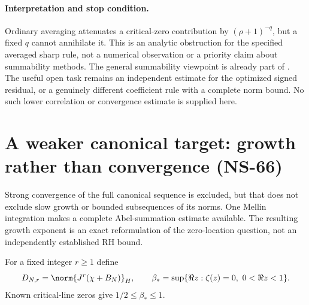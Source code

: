 \paragraph{Interpretation and stop condition.}
Ordinary averaging attenuates a critical-zero contribution by
$(\rho+1)^{-q}$, but a fixed $q$ cannot annihilate it. This is an
analytic obstruction for the specified averaged sharp rule, not a
numerical observation or a priority claim about summability methods.
The general summability viewpoint is already part of
\cite[Section 3]{BaezDuarteStrong}. The useful open task remains an
independent estimate for the optimized signed residual, or a genuinely
different coefficient rule with a complete norm bound. No such lower
correlation or convergence estimate is supplied here.

\section{A weaker canonical target: growth rather than convergence (NS-66)}
\label{sec:ns66-canonical-growth}

Strong convergence of the full canonical sequence is excluded, but
that does not exclude slow growth or bounded subsequences of its norms.
One Mellin integration makes a complete Abel-summation estimate
available. The resulting growth exponent is an exact reformulation
of the zero-location question, not an independently established RH bound.

For a fixed integer $r\geq1$ define
\[
 D_{N,r}=\norm{J^r(\chi+B_N)}_H,\qquad
 \beta_* =\sup\{\Re z:\zeta(z)=0,\ 0<\Re z<1\}.
\]
Known critical-line zeros give $1/2\leq\beta_*\leq1$.


